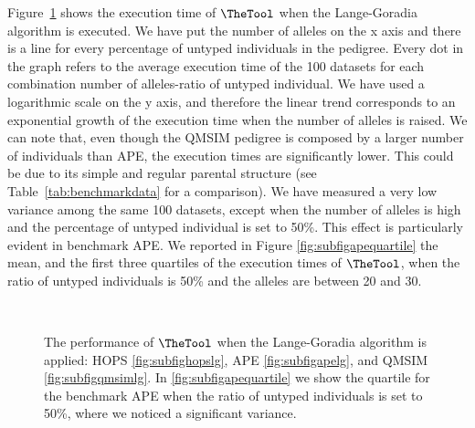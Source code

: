 Figure~\ref{fig:celer-lg} shows the execution time of {$\TheTool$} when the
Lange-Goradia algorithm is executed. We have put the number of alleles on the x
axis and there is a line for every percentage of untyped individuals in the
pedigree. Every dot in the graph refers to the average execution time of the 100
datasets for each combination number of alleles-ratio of untyped individual. We
have used a logarithmic scale on the y axis, and therefore the linear trend
corresponds to an exponential growth of the execution time when the number of
alleles is raised. We can note that, even though the QMSIM pedigree is composed
by a larger number of individuals than APE, the execution times are
significantly lower. This could be due to its simple and regular parental
structure (see Table~\ref{tab:benchmarkdata} for a comparison). We have measured
a very low variance among the same 100 datasets, except when the number of
alleles is high and the percentage of untyped individual is set to 50\%. This
effect is particularly evident in benchmark APE. We reported in Figure
\ref{fig:subfigapequartile} the mean, and the first three quartiles of the
execution times of {$\TheTool$}, when the ratio of untyped individuals is 50\%
and the alleles are between 20 and 30.

\begin{figure}
  \centering
  \\
  \caption{The performance of {$\TheTool$} when the Lange-Goradia algorithm is
    applied: HOPS \ref{fig:subfighopslg}, APE \ref{fig:subfigapelg}, and QMSIM
    \ref{fig:subfigqmsimlg}. In \ref{fig:subfigapequartile} we show the quartile
  for the benchmark APE when the ratio of untyped individuals is set to 50\%,
  where we noticed a significant variance.}
  \label{fig:celer-lg}
\end{figure}

